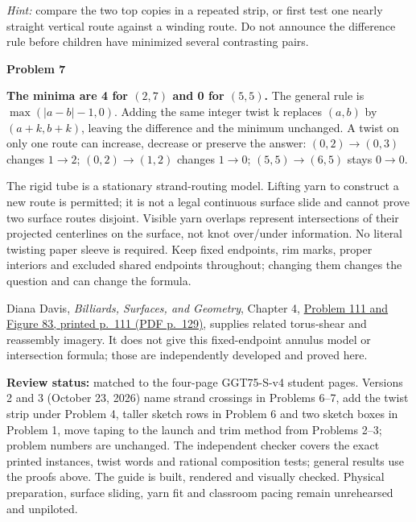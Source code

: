 \documentclass[11pt,letterpaper]{article}
\newcommand{\sect}[1]{\par\vspace{5pt}{\large\bfseries #1}\par}
\newcommand{\prob}[1]{\par\vspace{3pt}\textbf{Problem #1}\par}
\begin{document}
\textit{Hint:} compare the two top copies in a repeated strip, or first test
one nearly straight vertical route against a winding route. Do not announce
the difference rule before children have minimized several contrasting pairs.

\prob{7}
\textbf{The minima are 4 for $(2,7)$ and 0 for $(5,5)$.} The general rule is
$\max(|a-b|-1,0)$. Adding the same integer twist k replaces $(a,b)$ by
$(a+k,b+k)$, leaving the difference and the minimum unchanged.
A twist on only one route can increase, decrease or preserve the answer:
$(0,2)\to(0,3)$ changes $1\to2$;
$(0,2)\to(1,2)$ changes $1\to0$;
$(5,5)\to(6,5)$ stays $0\to0$.

\sect{Physical meaning and source limits}
The rigid tube is a stationary strand-routing model. Lifting yarn to construct
a new route is permitted; it is not a legal continuous surface slide and cannot
prove two surface routes disjoint. Visible yarn overlaps represent intersections
of their projected centerlines on the surface, not knot over/under information.
No literal twisting paper sleeve is required. Keep fixed endpoints, rim marks,
proper interiors and excluded shared endpoints throughout; changing them changes
the question and can change the formula.

Diana Davis, \emph{Billiards, Surfaces, and Geometry}, Chapter 4,
\href{https://dianadavis.github.io/billiards-book.pdf}{Problem 111 and Figure 83, printed p.\ 111 (PDF p.\ 129)}, supplies related torus-shear and reassembly imagery.
It does not give this fixed-endpoint annulus model or intersection formula;
those are independently developed and proved here.

\textbf{Review status:} matched to the four-page GGT75-S-v4 student pages.
Versions 2 and 3 (October 23, 2026) name strand crossings in Problems 6--7, add
the twist strip under Problem 4, taller sketch rows in Problem 6 and two sketch
boxes in Problem 1, move taping to the launch and trim method from Problems 2--3;
problem numbers are unchanged.
The independent checker covers the exact printed instances, twist words and
rational composition tests; general results use the proofs above. The guide is
built, rendered and visually checked. Physical preparation, surface sliding,
yarn fit and classroom pacing remain unrehearsed and unpiloted.
\end{document}
